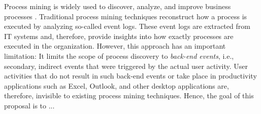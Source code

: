 Process mining is widely used to discover, analyze, and improve business processes \cite{van2016data}. Traditional process mining techniques reconstruct how a process is executed by analyzing so-called event logs. These event logs are extracted from IT systems and, therefore, provide insights into how exactly processes are executed in the organization. However, this approach has an important limitation: It limits the scope of process discovery to \textit{back-end events}, i.e., secondary, indirect events that were triggered by the actual user activity. User activities that do not result in such back-end events or take place in productivity applications such as Excel, Outlook, and other desktop applications are, therefore, invisible to existing process mining techniques. Hence, the goal of this proposal is to ... 


